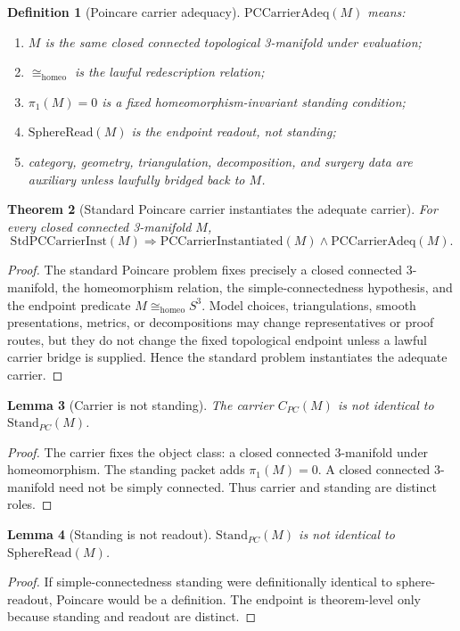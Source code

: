\documentclass[11pt]{article}
\newtheorem{theorem}{Theorem}[section]
\newtheorem{lemma}[theorem]{Lemma}
\newtheorem{definition}[theorem]{Definition}
\newcommand{\Sthree}{S^{3}}
\newcommand{\StandPC}{\mathrm{Stand}_{PC}}
\newcommand{\SphereRead}{\mathrm{SphereRead}}
\newcommand{\CarrierPC}{C_{PC}}
\newcommand{\PCCarrierInst}{\mathrm{PCCarrierInstantiated}}
\newcommand{\Homeo}{\cong_{\mathrm{homeo}}}
\begin{document}
\begin{definition}[Poincare carrier adequacy]
\(\mathrm{PCCarrierAdeq}(M)\) means:
\begin{enumerate}[label=(\alph*)]
\item \(M\) is the same closed connected topological 3-manifold under evaluation;
\item \(\Homeo\) is the lawful redescription relation;
\item \(\pi_1(M)=0\) is a fixed homeomorphism-invariant standing condition;
\item \(\SphereRead(M)\) is the endpoint readout, not standing;
\item category, geometry, triangulation, decomposition, and surgery data are auxiliary unless lawfully bridged back to \(M\).
\end{enumerate}
\end{definition}

\begin{theorem}[Standard Poincare carrier instantiates the adequate carrier]\label{thm:std-carrier-adequate}
For every closed connected 3-manifold \(M\),
\[
\mathrm{StdPCCarrierInst}(M)\Rightarrow \PCCarrierInst(M)\wedge \mathrm{PCCarrierAdeq}(M).
\]
\end{theorem}
\begin{proof}
The standard Poincare problem fixes precisely a closed connected 3-manifold, the homeomorphism relation, the simple-connectedness hypothesis, and the endpoint predicate \(M\Homeo\Sthree\). Model choices, triangulations, smooth presentations, metrics, or decompositions may change representatives or proof routes, but they do not change the fixed topological endpoint unless a lawful carrier bridge is supplied. Hence the standard problem instantiates the adequate carrier.
\end{proof}

\begin{lemma}[Carrier is not standing]
The carrier \(\CarrierPC(M)\) is not identical to \(\StandPC(M)\).
\end{lemma}
\begin{proof}
The carrier fixes the object class: a closed connected 3-manifold under homeomorphism. The standing packet adds \(\pi_1(M)=0\). A closed connected 3-manifold need not be simply connected. Thus carrier and standing are distinct roles.
\end{proof}

\begin{lemma}[Standing is not readout]
\(\StandPC(M)\) is not identical to \(\SphereRead(M)\).
\end{lemma}
\begin{proof}
If simple-connectedness standing were definitionally identical to sphere-readout, Poincare would be a definition. The endpoint is theorem-level only because standing and readout are distinct.
\end{proof}
\end{document}

